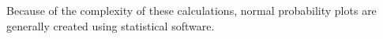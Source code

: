 Because of the complexity of these calculations, normal probability plots are generally created using statistical software.















%
%
%
%
%
%
%
%
%






